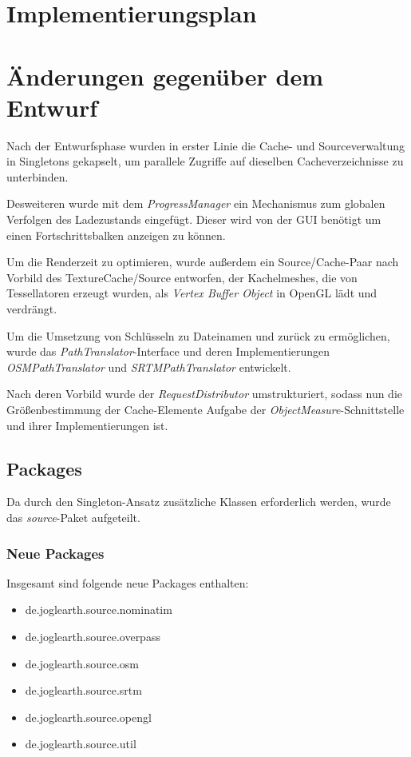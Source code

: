 \documentclass[10pt]{scrreprt}
\begin{document}
\chapter{Implementierungsplan}




\chapter{Änderungen gegenüber dem Entwurf}

Nach der Entwurfsphase wurden in erster Linie die Cache- und Sourceverwaltung in Singletons gekapselt, um parallele Zugriffe auf dieselben Cacheverzeichnisse zu unterbinden.

Desweiteren wurde mit dem \textit{ProgressManager} ein Mechanismus zum globalen Verfolgen des Ladezustands eingefügt. Dieser wird von der GUI benötigt um einen Fortschrittsbalken anzeigen zu können.

Um die Renderzeit zu optimieren, wurde außerdem ein Source/Cache-Paar nach Vorbild des TextureCache/Source entworfen, der Kachelmeshes, die von Tessellatoren erzeugt wurden, als \textit{Vertex Buffer Object} in OpenGL lädt und verdrängt.

Um die Umsetzung von Schlüsseln zu Dateinamen und zurück zu ermöglichen, wurde das \textit{PathTranslator}-Interface und deren Implementierungen \textit{OSMPathTranslator} und \textit{SRTMPathTranslator} entwickelt. 

Nach deren Vorbild wurde der \textit{RequestDistributor} umstrukturiert, sodass nun die Größenbestimmung der Cache-Elemente Aufgabe der \textit{ObjectMeasure}-Schnittstelle und ihrer Implementierungen ist.

\section{Packages}

Da durch den Singleton-Ansatz zusätzliche Klassen erforderlich werden, wurde das \textit{source}-Paket aufgeteilt. 

\subsection*{Neue Packages}
Insgesamt sind folgende neue Packages enthalten:
\begin{itemize}
\item de.joglearth.source.nominatim
\item de.joglearth.source.overpass
\item de.joglearth.source.osm
\item de.joglearth.source.srtm
\item de.joglearth.source.opengl
\item de.joglearth.source.util
\end{itemize}
\end{document}
